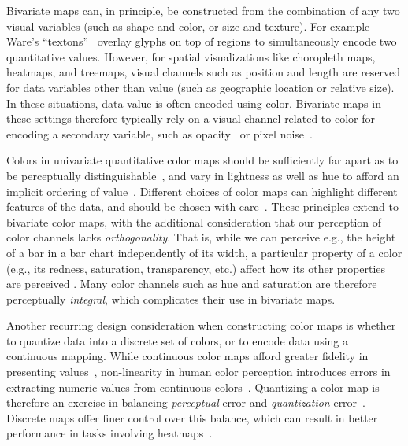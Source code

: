 Bivariate maps can, in principle, be constructed from the combination of any two visual variables (such as shape and color, or size and texture). For example Ware's ``textons''~\cite{ware2009quantitative} overlay glyphs on top of regions to simultaneously encode two quantitative values. However, for spatial visualizations like choropleth maps, heatmaps, and treemaps, visual channels such as position and length are reserved for data variables other than value (such as geographic location or relative size). In these situations, data value is often encoded using color. Bivariate maps in these settings therefore typically rely on a visual channel related to color for encoding a secondary variable, such as opacity~\cite{roth2010value} or pixel noise~\cite{lucchesi2017visualizing}.

Colors in univariate quantitative color maps should be sufficiently far apart as to be perceptually distinguishable~\cite{ware1988color}, and vary in lightness as well as hue to afford an implicit ordering of value~\cite{borland2007rainbow,rogowitz2001blair}. Different choices of color maps can highlight different features of the data, and should be chosen with care~\cite{rogowitz1996not}. These principles extend to bivariate color maps, with the additional consideration that our perception of color channels lacks \emph{orthogonality}. That is, while we can perceive e.g., the height of a bar in a bar chart independently of its width, a particular property of a color (e.g., its redness, saturation, transparency, etc.) affect how its other properties are perceived \cite{ware2012information,garner1970integrality}. Many color channels such as hue and saturation are therefore perceptually \emph{integral}, which complicates their use in bivariate maps.

Another recurring design consideration when constructing color maps is whether to quantize data into a discrete set of colors, or to encode data using a continuous mapping. While continuous color maps afford greater fidelity in presenting values~\cite{muller1979perception}, non-linearity in human color perception introduces errors in extracting numeric values from continuous colors~\cite{borland2007rainbow}. Quantizing a color map is therefore an exercise in balancing \emph{perceptual} error and \emph{quantization} error~\cite{dobson1973choropleth}. Discrete maps offer finer control over this balance, which can result in better performance in tasks involving heatmaps~\cite{padilla2017evaluating}.

